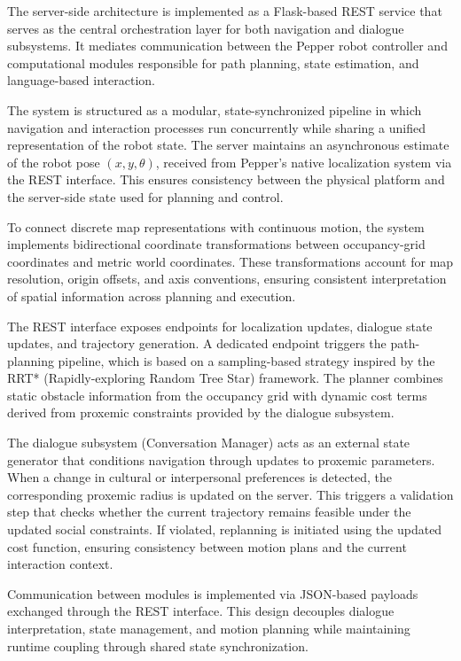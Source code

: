 The server-side architecture is implemented as a Flask-based REST service that serves as the central orchestration layer for both navigation and dialogue subsystems. It mediates communication between the Pepper robot controller and computational modules responsible for path planning, state estimation, and language-based interaction.

The system is structured as a modular, state-synchronized pipeline in which navigation and interaction processes run concurrently while sharing a unified representation of the robot state. The server maintains an asynchronous estimate of the robot pose $(x, y, \theta)$, received from Pepper’s native localization system via the REST interface. This ensures consistency between the physical platform and the server-side state used for planning and control.

To connect discrete map representations with continuous motion, the system implements bidirectional coordinate transformations between occupancy-grid coordinates and metric world coordinates. These transformations account for map resolution, origin offsets, and axis conventions, ensuring consistent interpretation of spatial information across planning and execution.

The REST interface exposes endpoints for localization updates, dialogue state updates, and trajectory generation. A dedicated endpoint triggers the path-planning pipeline, which is based on a sampling-based strategy inspired by the RRT* (Rapidly-exploring Random Tree Star) framework. The planner combines static obstacle information from the occupancy grid with dynamic cost terms derived from proxemic constraints provided by the dialogue subsystem.

The dialogue subsystem (Conversation Manager) acts as an external state generator that conditions navigation through updates to proxemic parameters. When a change in cultural or interpersonal preferences is detected, the corresponding proxemic radius is updated on the server. This triggers a validation step that checks whether the current trajectory remains feasible under the updated social constraints. If violated, replanning is initiated using the updated cost function, ensuring consistency between motion plans and the current interaction context.

Communication between modules is implemented via JSON-based payloads exchanged through the REST interface. This design decouples dialogue interpretation, state management, and motion planning while maintaining runtime coupling through shared state synchronization.




